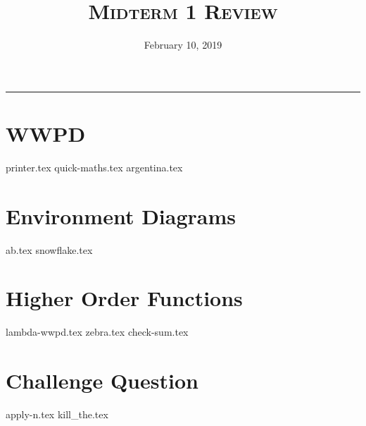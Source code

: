 \documentclass{exam}
\title{\textsc{Midterm 1 Review}}
\date{February 10, 2019}
\begin{document}
\maketitle
\rule{\textwidth}{0.15em}
\fontsize{12}{15}\selectfont


\section{WWPD}
\begin{questions}
{printer.tex}
{quick-maths.tex}
{argentina.tex}
\end{questions}

\newpage
\section{Environment Diagrams}
\begin{questions}
{ab.tex}
{snowflake.tex}

\end{questions}

\newpage
\section{Higher Order Functions}
\begin{questions}
{lambda-wwpd.tex}
{zebra.tex}
\newpage
{check-sum.tex}
\end{questions}


\section{Challenge Question}
\begin{questions}
{apply-n.tex}
{kill_the.tex}
\end{questions}
\end{document}
